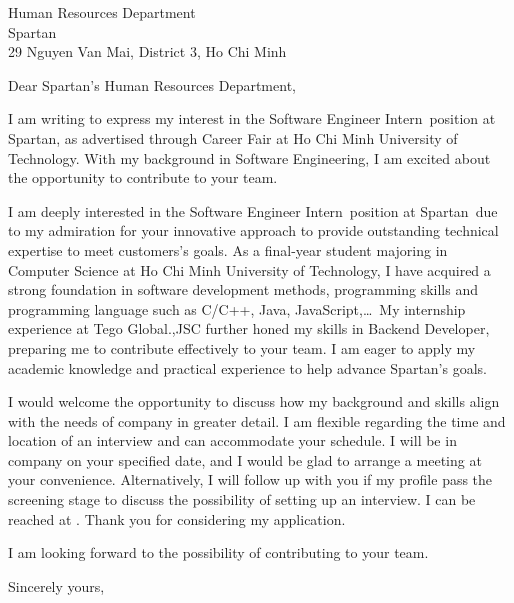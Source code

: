 \documentclass[
	parskip=half, %
	enlargefirstpage=true, %
]{scrlttr2} %
\newcommand{\TOHRNAME}{}
\newcommand{\TOPOSITION}{Human Resources Department}
\newcommand{\TOCOMPANY}{Spartan}
\newcommand{\TOLOCATION}{29 Nguyen Van Mai, District 3, Ho Chi Minh}
\newcommand{\COMPANYSERVICE}{provide outstanding technical expertise to meet customers's goals}
\newcommand{\JOBTITLE}{Software Engineer Intern}
\newcommand{\COMPANY}{\TOCOMPANY}
\newcommand{\JOBBOARD}{Career Fair at Ho Chi Minh University of Technology}
\newcommand{\MYFIELD}{Software Engineering}
\begin{document}

\begin{letter}{
	\TOPOSITION \\
	\TOCOMPANY \\
	\TOLOCATION
}

\opening{Dear \TOCOMPANY's \TOPOSITION,}

I am writing to express my interest in the \JOBTITLE\ position at \COMPANY, as advertised through \JOBBOARD. With my background in \MYFIELD, I am excited about the opportunity to contribute to your team.

I am deeply interested in the \JOBTITLE\ position at \COMPANY\ due to my admiration for your innovative approach to \COMPANYSERVICE. As a final-year student majoring in Computer Science at Ho Chi Minh University of Technology, I have acquired a strong foundation in software development methods, programming skills and programming language such as C/C++, Java, JavaScript,\dots\ My internship experience at Tego Global.,JSC further honed my skills in Backend Developer, preparing me to contribute effectively to your team. I am eager to apply my academic knowledge and practical experience to help advance \COMPANY's goals.

I would welcome the opportunity to discuss how my background and skills align with the needs of company in greater detail. I am flexible regarding the time and location of an interview and can accommodate your schedule. I will be in company on your specified date, and I would be glad to arrange a meeting at your convenience. Alternatively, I will follow up with you if my profile pass the screening stage to discuss the possibility of setting up an interview. I can be reached at . Thank you for considering my application.

I am looking forward to the possibility of contributing to your team.

Sincerely yours, \\


\end{letter}
\end{document}
